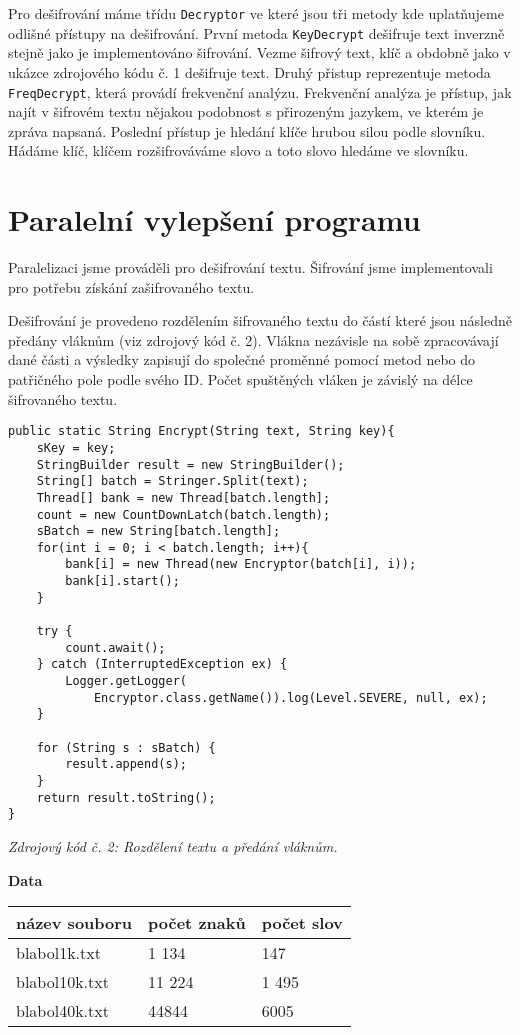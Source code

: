 \documentclass{article}
\begin{document}
Pro dešifrování máme třídu \texttt{Decryptor} ve které jsou tři metody kde uplatňujeme
odlišné přístupy na dešifrování. První metoda \texttt{KeyDecrypt} dešifruje text inverzně
stejně jako je implementováno šifrování. Vezme šifrový text, klíč a obdobně jako v ukázce
zdrojového kódu č. 1 dešifruje text. Druhý přistup reprezentuje metoda \texttt{FreqDecrypt},
která provádí frekvenční analýzu. Frekvenční analýza je přístup, jak najít v šifrovém textu
nějakou podobnost s přirozeným jazykem, ve kterém je zpráva napsaná. Poslední přístup je
hledání klíče hrubou silou podle slovníku. Hádáme klíč, klíčem rozšifrováváme slovo a toto
slovo hledáme ve slovníku.
\newline

\section{Paralelní vylepšení programu}
Paralelizaci jsme prováděli pro dešifrování textu. Šifrování jsme implementovali pro
potřebu získání zašifrovaného textu.

Dešifrování je provedeno rozdělením šifrovaného textu do částí které jsou následně
předány vláknům (viz zdrojový kód č. 2).
Vlákna nezávisle na sobě zpracovávají dané části a výsledky zapisují
do společné proměnné pomocí metod nebo do patřičného pole podle svého ID. Počet
spuštěných vláken je závislý na délce šifrovaného textu.

\begin{center}
\begin{lstlisting}
public static String Encrypt(String text, String key){
	sKey = key;
	StringBuilder result = new StringBuilder();
	String[] batch = Stringer.Split(text);
	Thread[] bank = new Thread[batch.length];
	count = new CountDownLatch(batch.length);
	sBatch = new String[batch.length];
	for(int i = 0; i < batch.length; i++){
		bank[i] = new Thread(new Encryptor(batch[i], i));
		bank[i].start();
	}
	
	try {
		count.await();
	} catch (InterruptedException ex) {
		Logger.getLogger(
			Encryptor.class.getName()).log(Level.SEVERE, null, ex);
	}
	
	for (String s : sBatch) {
		result.append(s);
	}
	return result.toString();
}
\end{lstlisting}
\vspace{1mm}
\textit{Zdrojový kód č. 2: Rozdělení textu a předání vláknům.}
\end{center}

\textbf{Data}
\newline
\begin{tabular}{ l | l | l }
  \textbf{název souboru} & počet znaků & počet slov \\
  \hline
  blabol1k.txt & 1 134 & 147 \\
  blabol10k.txt & 11 224 & 1 495 \\
  blabol40k.txt & 44844 & 6005 \\
  \hline
\end{tabular}
\newline
\end{document}
